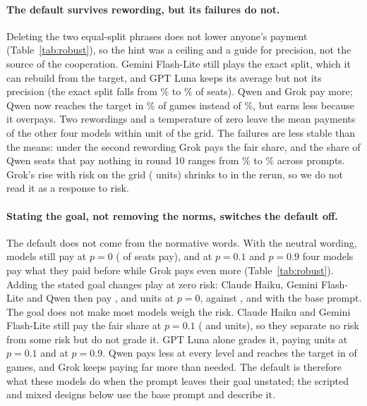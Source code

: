 \paragraph{The default survives rewording, but its failures do not.}
Deleting the two equal-split phrases does not lower anyone's payment
(Table~\ref{tab:robust}), so the hint was a ceiling and a guide for precision, not the source
of the cooperation. Gemini Flash-Lite still plays the exact split, which it can rebuild from
the target, and GPT Luna keeps its average but not its precision (the exact split falls from
\NoCueLunaExactBasePct\% to \NoCueLunaExactPct\% of seats). Qwen and Grok pay more; Qwen now
reaches the target in \NoCueQwenReach\% of games instead of \NoCueQwenReachBase\%, but earns
less because it overpays. Two rewordings and a temperature of zero leave the mean payments of
the other four models within \RobFlatMaxShift{} unit of the grid. The failures are less stable
than the means: under the second rewording Grok pays the fair share, and the share of Qwen
seats that pay nothing in round 10 ranges from \RobQwenLastZeroNoHint\% to
\RobQwenLastZeroParaTwo\% across prompts. Grok's rise with risk on the grid
(\RobGrokRiskBase{} units) shrinks to \RobGrokRiskRerun{} in the rerun, so we do not read it
as a response to risk.

\paragraph{Stating the goal, not removing the norms, switches the default off.}
The default does not come from the normative words. With the neutral wording,
\WorZeroModelsPaying{} models still pay at $p=0$ (\WorZeroPaying{} of \WorZeroSeats{} seats
pay), and at $p=0.1$ and $p=0.9$ four models pay what they paid before while Grok pays even
more (Table~\ref{tab:robust}). Adding the stated goal changes play at zero risk: Claude Haiku,
Gemini Flash-Lite and Qwen then pay \NeuZeroHaiku{}, \NeuZeroFlashLite{} and \NeuZeroQwen{}
units at $p=0$, against \GridZeroHaiku{}, \GridZeroFlashLite{} and \GridZeroQwen{} with the
base prompt. The goal does not make most models weigh the risk. Claude Haiku and Gemini
Flash-Lite still pay the fair share at $p=0.1$ (\NeuLowHaiku{} and \NeuLowFlashLite{} units),
so they separate no risk from some risk but do not grade it. GPT Luna alone grades it, paying
\NeuLowLuna{} units at $p=0.1$ and \NeuHighLuna{} at $p=0.9$. Qwen pays less at every level
and reaches the target in \NeuReachQwen{} of \NeuGamesQwen{} games, and Grok keeps paying far
more than needed. The default is therefore what these models do when the prompt leaves their
goal unstated; the scripted and mixed designs below use the base prompt and describe it.

